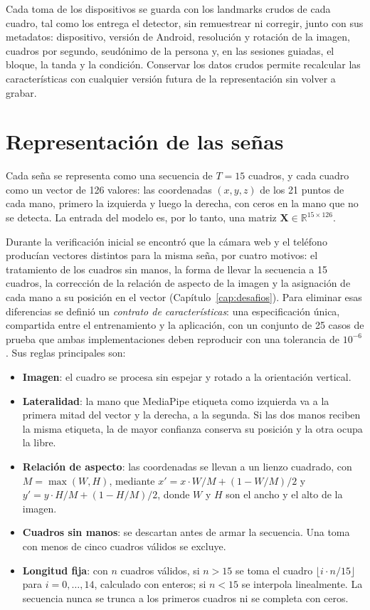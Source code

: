 Cada toma de los dispositivos se guarda con los landmarks crudos de cada cuadro, tal como los entrega el detector, sin remuestrear ni corregir, junto con sus metadatos: dispositivo, versión de Android, resolución y rotación de la imagen, cuadros por segundo, seudónimo de la persona y, en las sesiones guiadas, el bloque, la tanda y la condición. Conservar los datos crudos permite recalcular las características con cualquier versión futura de la representación sin volver a grabar.

\section{Representación de las señas}
\label{sec:representacion}

Cada seña se representa como una secuencia de $T = 15$ cuadros, y cada cuadro como un vector de 126 valores: las coordenadas $(x, y, z)$ de los 21 puntos de cada mano, primero la izquierda y luego la derecha, con ceros en la mano que no se detecta. La entrada del modelo es, por lo tanto, una matriz $\mathbf{X} \in \mathbb{R}^{15 \times 126}$.

Durante la verificación inicial se encontró que la cámara web y el teléfono producían vectores distintos para la misma seña, por cuatro motivos: el tratamiento de los cuadros sin manos, la forma de llevar la secuencia a 15 cuadros, la corrección de la relación de aspecto de la imagen y la asignación de cada mano a su posición en el vector (Capítulo~\ref{cap:desafios}). Para eliminar esas diferencias se definió un \emph{contrato de características}: una especificación única, compartida entre el entrenamiento y la aplicación, con un conjunto de 25 casos de prueba que ambas implementaciones deben reproducir con una tolerancia de $10^{-6}$. Sus reglas principales son:

\begin{itemize}
    \item \textbf{Imagen}: el cuadro se procesa sin espejar y rotado a la orientación vertical.
    \item \textbf{Lateralidad}: la mano que MediaPipe etiqueta como izquierda va a la primera mitad del vector y la derecha, a la segunda. Si las dos manos reciben la misma etiqueta, la de mayor confianza conserva su posición y la otra ocupa la libre.
    \item \textbf{Relación de aspecto}: las coordenadas se llevan a un lienzo cuadrado, con $M = \max(W, H)$, mediante $x' = x \cdot W/M + (1 - W/M)/2$ y $y' = y \cdot H/M + (1 - H/M)/2$, donde $W$ y $H$ son el ancho y el alto de la imagen.
    \item \textbf{Cuadros sin manos}: se descartan antes de armar la secuencia. Una toma con menos de cinco cuadros válidos se excluye.
    \item \textbf{Longitud fija}: con $n$ cuadros válidos, si $n > 15$ se toma el cuadro $\lfloor i \cdot n / 15 \rfloor$ para $i = 0, \ldots, 14$, calculado con enteros; si $n < 15$ se interpola linealmente. La secuencia nunca se trunca a los primeros cuadros ni se completa con ceros.
\end{itemize}


